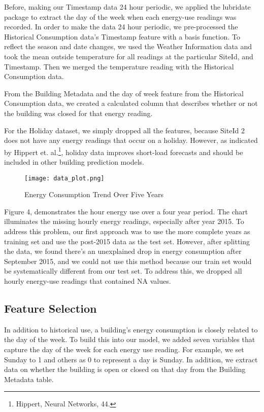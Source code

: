\documentclass[twoside,11pt]{article}
\begin{document}
Before, making our Timestamp data 24 hour periodic, we applied the lubridate package to extract the day of the week when each energy-use readings was recorded. In order to make the data 24 hour periodic, we pre-processed the Historical Consumption data's Timestamp feature with a basis function. To reflect the season and date changes, we used the Weather Information data and took the mean outside temperature for all readings at the particular SiteId, and Timestamp. Then we merged the temperature reading with the Historical Consumption data. 

From the Building Metadata and the day of week feature from the Historical Consumption data, we created a calculated column that describes whether or not the building was closed for that energy reading. 

For the Holiday dataset, we simply dropped all the features, because SiteId 2 does not have any energy readings that occur on a holiday. However, as indicated by Hippert et. al.\footnote{Hippert, Neural Networks, 44.}, holiday data improves short-load forecasts and should be included in other building prediction models. 

 \begin{figure}[!htbp]
  \centering 
  \texttt{[image: data\_plot.png]} 
  \caption{Energy Consumption Trend Over Five Years}
  \label{fig:example} 
\end{figure}
\FloatBarrier
Figure 4, demonstrates the hour energy use over a four year period. The chart illuminates the missing hourly energy readings, especially after year 2015. To address this problem, our first approach was to use the more complete years as training set and use the post-2015 data as the test set. However, after splitting the data, we found there's an unexplained drop in energy consumption after September 2015, and we could not use this method because our train set would be systematically different from our test set. To address this, we dropped all hourly energy-use readings that contained NA values.
\subsection{Feature Selection}

In addition to historical use, a building's energy consumption is closely related to the day of the week. To build this into our model, we added seven variables that capture the day of the week for each energy use reading. For example, we set Sunday to 1 and others as 0 to represent a day is Sunday. In addition, we extract data on whether the building is open or closed on that day from the Building Metadata table.
\end{document}
